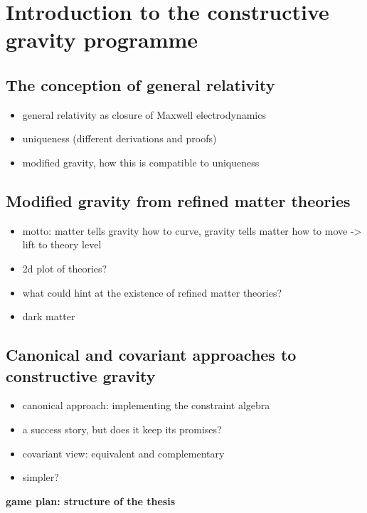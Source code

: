\chapter{Introduction to the constructive gravity programme}

\section{The conception of general relativity}

\begin{itemize}
\item general relativity as closure of Maxwell electrodynamics
\item uniqueness (different derivations and proofs)
\item modified gravity, how this is compatible to uniqueness
\end{itemize}

\section{Modified gravity from refined matter theories}

\begin{itemize}
\item motto: matter tells gravity how to curve, gravity tells matter how to move -> lift to theory level
\item 2d plot of theories?
\item what could hint at the existence of refined matter theories?
\item dark matter
\end{itemize}

\section{Canonical and covariant approaches to constructive gravity}

\begin{itemize}
\item canonical approach: implementing the constraint algebra
\item a success story, but does it keep its promises?
\item covariant view: equivalent and complementary
\item simpler?
\end{itemize}

\textbf{game plan: structure of the thesis}
